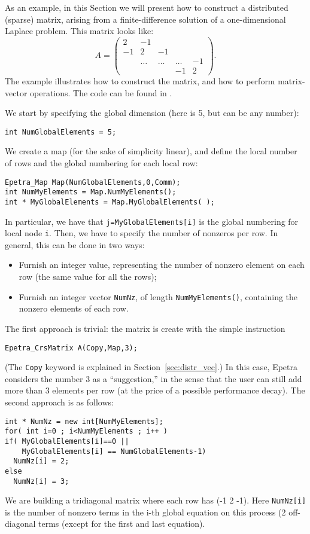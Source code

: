 As an example, in this Section we will present how to construct a
distributed (sparse) matrix, arising from a finite-difference solution
of a one-dimensional Laplace problem. This matrix looks like:
\begin{equation*}
A = \begin{pmatrix}
 2 & -1 &     &   &    \\
-1 &  2     & -1     &        &    \\
   & \ldots & \ldots & \ldots & -1 \\
   &        &        & -1     & 2
\end{pmatrix}.
\end{equation*}
The example illustrates how to construct the matrix,
and how to perform matrix-vector operations.
The code can be found in .

We start by specifying the global dimension (here is 5, but can be any
number):
\begin{verbatim}
int NumGlobalElements = 5;
\end{verbatim}
We create a map (for the sake of simplicity linear), and define the
local number of rows and the global numbering for each local row:
\begin{verbatim}
Epetra_Map Map(NumGlobalElements,0,Comm);
int NumMyElements = Map.NumMyElements();
int * MyGlobalElements = Map.MyGlobalElements( );
\end{verbatim}
In particular, we have that \verb!j=MyGlobalElements[i]! is the global
numbering for local node \verb!i!.  Then, we have to specify the number
of nonzeros per row. In general, this can be done in two ways:
\begin{itemize}
\item Furnish an integer value, representing the number of nonzero
  element on each row (the same value for all the rows);
\item Furnish an integer vector \verb!NumNz!, of length
  \verb!NumMyElements()!, containing the nonzero elements of each row.
\end{itemize}

The first approach is trivial: the matrix is create with the simple
instruction
\begin{verbatim}
Epetra_CrsMatrix A(Copy,Map,3);
\end{verbatim}
(The \verb!Copy! keyword is explained in Section~\ref{sec:distr_vec}.)
In this case, Epetra considers the number 3 as a ``suggestion,'' in the
sense that the user can still add more than 3 elements per row (at the
price of a possible performance decay).  The second approach is as
follows:
\begin{verbatim}
int * NumNz = new int[NumMyElements];
for( int i=0 ; i<NumMyElements ; i++ )
if( MyGlobalElements[i]==0 || 
    MyGlobalElements[i] == NumGlobalElements-1)
  NumNz[i] = 2;
else
  NumNz[i] = 3;
\end{verbatim}
We are building a tridiagonal matrix where each row has (-1 2 -1).  Here
\verb!NumNz[i]! is the number of nonzero terms in the i-th global
equation on this process (2 off-diagonal terms (except for the first and
last equation).

